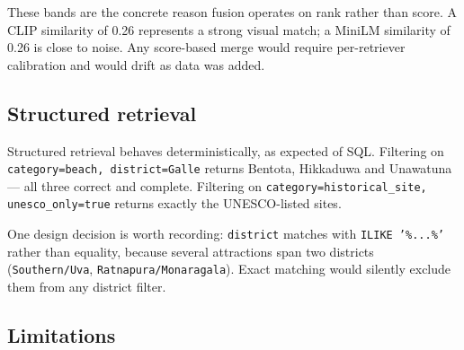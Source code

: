 \documentclass[11pt,a4paper]{article}
\begin{document}
These bands are the concrete reason fusion operates on rank rather than score. A
CLIP similarity of 0.26 represents a strong visual match; a MiniLM similarity of
0.26 is close to noise. Any score-based merge would require per-retriever
calibration and would drift as data was added.

\subsection{Structured retrieval}

Structured retrieval behaves deterministically, as expected of SQL. Filtering on
\texttt{category=beach, district=Galle} returns Bentota, Hikkaduwa and Unawatuna
--- all three correct and complete. Filtering on
\texttt{category=historical\_site, unesco\_only=true} returns exactly the
UNESCO-listed sites.

One design decision is worth recording: \texttt{district} matches with
\texttt{ILIKE '\%...\%'} rather than equality, because several attractions span
two districts (\texttt{Southern/Uva}, \texttt{Ratnapura/Monaragala}). Exact
matching would silently exclude them from any district filter.

\subsection{Limitations}
\label{sec:limitations}
\end{document}

